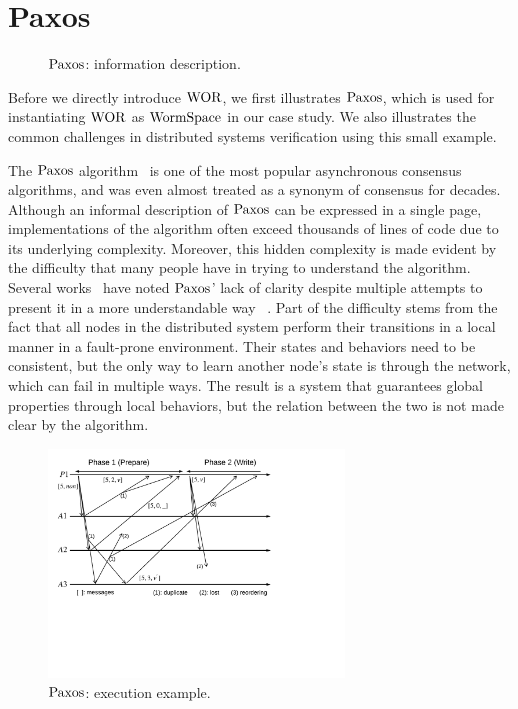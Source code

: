 \section{Paxos} 
\label{sec:paxos} 

\begin{figure}
\begin{minipage}{\linewidth}
\begin{multicols}{2}

\end{multicols}
\end{minipage}
\caption{$\mathrm{Paxos}$: information description.}
\label{fig:chapter:multipaxos:paxos-pseudocode}
\end{figure}

Before we directly introduce $\mathrm{WOR}$,
we first illustrates $\mathrm{Paxos}$, which is used for instantiating $\mathrm{WOR}$ as $\mathrm{WormSpace}$ in our case study.
We also illustrates the common challenges in distributed systems verification using this small example.

The $\mathrm{Paxos}$ algorithm~\cite{paxos}
is  one of the most popular asynchronous consensus algorithms, and was even almost treated as a synonym of
consensus for decades.
Although an informal description of $\mathrm{Paxos}$ can be expressed in a single page,
implementations of the algorithm often exceed thousands of lines of code due to its underlying complexity.
Moreover, this hidden complexity is made evident by the difficulty that many people have in trying to understand the algorithm.
Several works~\cite{raft, rvrpaxos} have noted $\mathrm{Paxos}$' lack of clarity despite multiple attempts to present
it in a more understandable way ~\cite{paxosmadesimple, Lampson1996, Lampson2001, dpaxos}.
Part of the difficulty stems from the fact that all nodes in the distributed system perform their transitions in a local manner in a fault-prone environment.
Their states and behaviors need to be consistent, but
the only way to learn another node's state is through the network, which can fail in multiple ways.
The result is a system that guarantees global properties through local behaviors, but the relation between the two is not made clear by the algorithm.

\begin{figure}
\begin{center}
\includegraphics[width=0.7\textwidth]{figs/multipaxos/paxos_example_nowitness}
\end{center}
\caption{$\mathrm{Paxos}$: execution example.}
\label{fig:chapter:multipaxos:paxos-example}
\end{figure}

